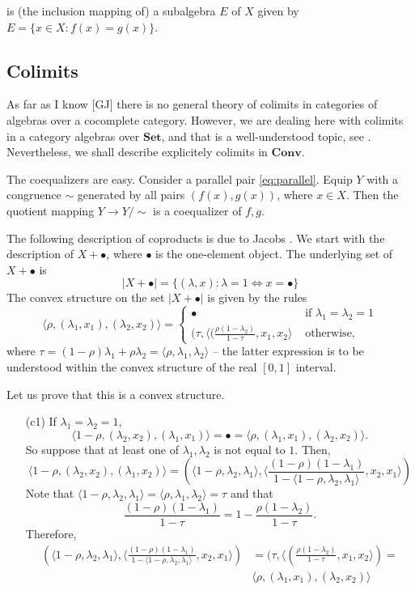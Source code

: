 \documentclass[12pt,letterpaper]{article}
\newcommand{\ct}[1]{\mathbf{#1}}
\newcommand{\<}{\langle}
\def\>{\rangle}
\begin{document}
is (the inclusion mapping of) a subalgebra $E$ of $X$ given by
$E=\{x\in X\colon f(x)=g(x)\}$.

\subsection{Colimits}

As far as I know [GJ] there is no general theory of colimits in categories of algebras over a
cocomplete category. However, we are dealing here with colimits in a category algebras over $\ct{Set}$, and
that is a well-understood topic, see \cite{...}. Nevertheless, we shall 
describe explicitely colimits
in $\ct{Conv}$. 

The coequalizers are easy. Consider a parallel pair \eqref{eq:parallel}. Equip
$Y$ with a congruence $\sim$ generated by all pairs $(f(x),g(x))$, where $x\in X$.
Then the quotient mapping $Y\to Y/\sim$ is a coequalizer of $f,g$.

The following description of coproducts is due to Jacobs \cite{...}. We start with the
description of $X+\bullet$, where $\bullet$ is the one-element object. The underlying
set of $X+\bullet$ is
$$
|X+\bullet|=\{(\lambda,x)\colon \lambda=1\Leftrightarrow x=\bullet\}
$$
The convex structure on the set $|X+\bullet|$ is given by the rules
$$
\<\rho,(\lambda_1,x_1),(\lambda_2,x_2)\>=
\begin{cases}
\bullet & \text{ if $\lambda_1=\lambda_2=1$}\\
(\tau,\<(\frac{\rho(1-\lambda_2)}{1-\tau},x_1,x_2\>& \text{ otherwise,}
\end{cases}
$$
where $\tau=(1-\rho)\lambda_1+\rho\lambda_2=\<\rho,\lambda_1,\lambda_2\>$ -- the
latter expression is to be understood within the convex structure of the real $[0,1]$
interval.

Let us prove that this is a convex structure.
\begin{enumerate}
\item[(c1)]
If $\lambda_1=\lambda_2=1$, 
$$
\< 1-\rho,(\lambda_2,x_2),(\lambda_1,x_1)\>=\bullet=\<\rho,(\lambda_1,x_1),(\lambda_2,x_2)\>.
$$
So suppose that at least one of $\lambda_1,\lambda_2$ is not equal to $1$.
Then,
$$
\<1-\rho,(\lambda_2,x_2),(\lambda_1,x_2)\>=
	(\<1-\rho,\lambda_2,\lambda_1\>,
		\<\frac{(1-\rho)(1-\lambda_1)}{1-\<1-\rho,\lambda_2,\lambda_1\>},x_2,x_1\>)
$$
Note that $\<1-\rho,\lambda_2,\lambda_1\>=\<\rho,\lambda_1,\lambda_2\>=\tau$ and that
$$
\frac{(1-\rho)(1-\lambda_1)}{1-\tau}=
1-\frac{\rho(1-\lambda_2)}{1-\tau}.
$$
Therefore,
\begin{align*}
	(\<1-\rho,\lambda_2,\lambda_1\>,
		\<\frac{(1-\rho)(1-\lambda_1)}{1-\<1-\rho,\lambda_2,\lambda_1\>},x_2,x_1\>)&=
	(\tau,\<(\frac{\rho(1-\lambda_2)}{1-\tau},x_1,x_2\>)=\\
	&\<\rho,(\lambda_1,x_1),(\lambda_2,x_2)\>
\end{align*}

\end{enumerate}
\end{document}
